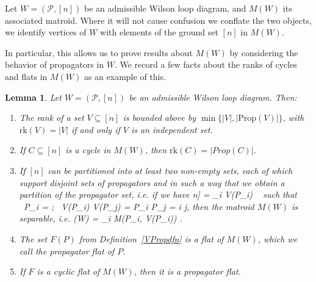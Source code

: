 \documentclass[11pt]{article}
\newcommand{\rk}{\textrm{rk} }
\def\bas #1\eas{\begin{align*} #1 \end{align*}}
\newcommand{\cP}{\mathcal{P}}
\newcommand{\Prop}{\textrm{Prop}}
\newtheorem{lem}[thm]{Lemma}
\theoremstyle{remark}
\theoremstyle{definition}
\begin{document}
Let $W = (\cP,[n])$ be an admissible Wilson loop diagram, and $M(W)$ its associated matroid. Where it will not cause confusion we conflate the two objects, we identify vertices of $W$ with elements of the ground set $[n]$ in $M(W)$. 

In particular, this allows us to prove results about $M(W)$ by considering the behavior of propagators in $W$. We record a few facts about the ranks of cycles and flats in $M(W)$ as an example of this.

\begin{lem}\label{lem facts about WLD matroids}
Let $W = (\cP,[n])$ be an admissible Wilson loop diagram. Then:
\begin{enumerate}
\item The rank of a set $V \subseteq [n]$ is bounded above by $\min\{|V|,|\Prop(V)|\}$, with $\rk(V) = |V|$ if and only if $V$ is an independent set.
\item If $C \subseteq [n]$ is a cycle in $M(W)$, then $\rk(C) = |Prop(C)|$.
\item If $[n]$ can be partitioned into at least two non-empty sets, each of which support disjoint sets of propagators and in such a way that we obtain a partition of the propagator set, i.e. if we have \bas [n] = \sqcup_i V(P_i) \ \textrm{ such that } \ \sqcup P_i = \cP; \   V(P_i) \cap V(P_j) = \emptyset {} P_i \cap P_j = \emptyset \quad \forall i \neq j\;, \eas then the matroid $M(W)$ is separable, i.e. \bas M(W) = \bigoplus_i M(P_i, V(P_i)) \;.\eas 
\item The set $F(P)$ from Definition~\ref{VPropdfn} is a flat of $M( W)$, which we call the \emph{propagator flat} of $P$.
\item If $F$ is a cyclic flat of $M(W)$, then it is a propagator flat.
\end{enumerate}
\end{lem}
\end{document}
